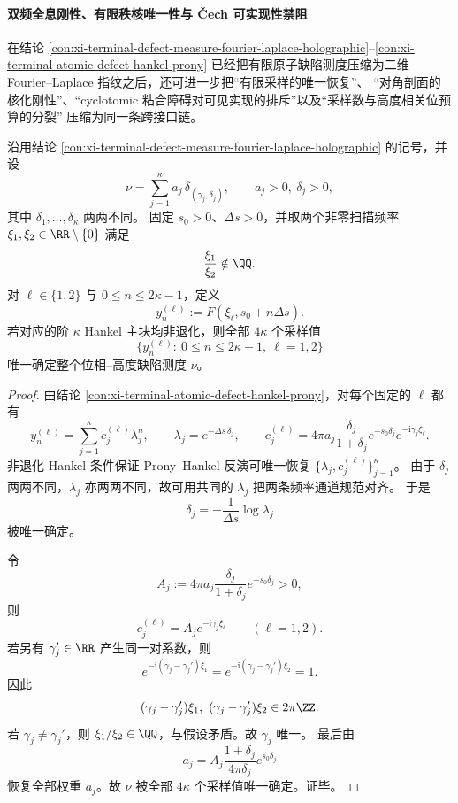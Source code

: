 \paragraph{双频全息刚性、有限秩核唯一性与 \texorpdfstring{\v{C}ech}{Cech} 可实现性禁阻}
在结论 \ref{con:xi-terminal-defect-measure-fourier-laplace-holographic}--\ref{con:xi-terminal-atomic-defect-hankel-prony}
已经把有限原子缺陷测度压缩为二维 Fourier--Laplace 指纹之后，还可进一步把“有限采样的唯一恢复”、
“对角剖面的核化刚性”、“cyclotomic 粘合障碍对可见实现的排斥”以及“采样数与高度相关位预算的分裂”
压缩为同一条跨接口链。

\begin{theorem}[双频有限采样的全息刚性]\label{thm:xi-bifrequency-finite-sampling-holographic-rigidity}
沿用结论 \ref{con:xi-terminal-defect-measure-fourier-laplace-holographic} 的记号，并设
\[
\nu=\sum_{j=1}^{\kappa} a_j\,\delta_{(\gamma_j,\delta_j)},
\qquad
a_j>0,\ \delta_j>0,
\]
其中 \(\delta_1,\dots,\delta_\kappa\) 两两不同。
固定 \(s_0>0\)、\(\Delta s>0\)，并取两个非零扫描频率 \(\xi_1,\xi_2\in\RR\setminus\{0\}\) 满足
\[
\frac{\xi_1}{\xi_2}\notin\QQ.
\]
对 \(\ell\in\{1,2\}\) 与 \(0\le n\le 2\kappa-1\)，定义
\[
y_n^{(\ell)}:=F(\xi_\ell,s_0+n\Delta s).
\]
若对应的阶 \(\kappa\) Hankel 主块均非退化，则全部 \(4\kappa\) 个采样值
\[
\{y_n^{(\ell)}:\ 0\le n\le 2\kappa-1,\ \ell=1,2\}
\]
唯一确定整个位相--高度缺陷测度 \(\nu\)。
\end{theorem}
\begin{proof}
由结论 \ref{con:xi-terminal-atomic-defect-hankel-prony}，对每个固定的 \(\ell\) 都有
\[
y_n^{(\ell)}=\sum_{j=1}^{\kappa} c_j^{(\ell)}\lambda_j^n,
\qquad
\lambda_j=e^{-\Delta s\,\delta_j},
\qquad
c_j^{(\ell)}=
4\pi a_j\frac{\delta_j}{1+\delta_j}e^{-s_0\delta_j}e^{-\mathrm{i}\gamma_j\xi_\ell}.
\]
非退化 Hankel 条件保证 Prony--Hankel 反演可唯一恢复 \(\{\lambda_j,c_j^{(\ell)}\}_{j=1}^{\kappa}\)。
由于 \(\delta_j\) 两两不同，\(\lambda_j\) 亦两两不同，故可用共同的 \(\lambda_j\) 把两条频率通道规范对齐。
于是
\[
\delta_j=-\frac{1}{\Delta s}\log \lambda_j
\]
被唯一确定。

令
\[
A_j:=4\pi a_j\frac{\delta_j}{1+\delta_j}e^{-s_0\delta_j}>0,
\]
则
\[
c_j^{(\ell)}=A_j e^{-\mathrm{i}\gamma_j\xi_\ell}
\qquad (\ell=1,2).
\]
若另有 \(\gamma_j'\in\RR\) 产生同一对系数，则
\[
e^{-\mathrm{i}(\gamma_j-\gamma_j')\xi_1}
=
e^{-\mathrm{i}(\gamma_j-\gamma_j')\xi_2}
=1.
\]
因此
\[
(\gamma_j-\gamma_j')\xi_1,\ (\gamma_j-\gamma_j')\xi_2\in 2\pi\ZZ.
\]
若 \(\gamma_j\neq \gamma_j'\)，则
\(
\xi_1/\xi_2\in\QQ
\)，与假设矛盾。故 \(\gamma_j\) 唯一。
最后由
\[
a_j=A_j\frac{1+\delta_j}{4\pi\delta_j}e^{s_0\delta_j}
\]
恢复全部权重 \(a_j\)。故 \(\nu\) 被全部 \(4\kappa\) 个采样值唯一确定。证毕。
\end{proof}


